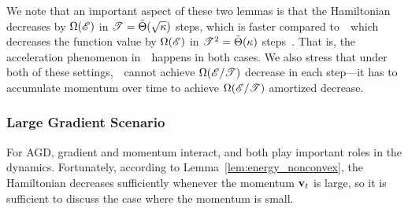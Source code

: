 We note that an important aspect of these two lemmas is that the Hamiltonian decreases by $\Omega(\mathscr{E})$ in $\mathscr{T} = \tilde{\Theta}(\sqrt{\kappa})$ steps, which is faster compared to~\pgd~which decreases the function value by $\Omega(\mathscr{E})$ in $\mathscr{T}^2 = \tilde{\Theta}(\kappa)$ steps~\citep{jin2017escape}.  That is, the acceleration phenomenon in~\pagd~happens in both cases.
We also stress that under both of these settings,~\pagd~cannot achieve $\Omega(\mathscr{E}/\mathscr{T})$ decrease in each step---it has to accumulate momentum over time to achieve $\Omega(\mathscr{E}/\mathscr{T})$ amortized decrease.











\subsubsection{Large Gradient Scenario}
For AGD, gradient and momentum interact, and both play important roles in the dynamics. Fortunately, according to Lemma~\ref{lem:energy_nonconvex}, the Hamiltonian decreases sufficiently whenever the momentum $\mathbf{v}_t$ is large, so it is sufficient to discuss the case where the momentum is small.

